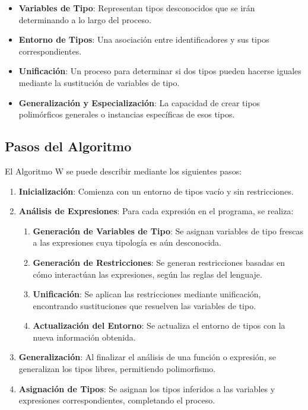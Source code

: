 \documentclass{article}
\begin{document}
  \begin{itemize}
    \item \textbf{Variables de Tipo}: Representan tipos desconocidos que se irán determinando a lo largo del proceso.

    \item \textbf{Entorno de Tipos}: Una asociación entre identificadores y sus tipos correspondientes.

    \item \textbf{Unificación}: Un proceso para determinar si dos tipos pueden hacerse iguales mediante la sustitución de variables de tipo.

    \item \textbf{Generalización y Especialización}: La capacidad de crear tipos polimórficos generales o instancias específicas de esos tipos.
  \end{itemize}

  \subsection{Pasos del Algoritmo}

  El Algoritmo W se puede describir mediante los siguientes pasos:

  \begin{enumerate}
    \item \textbf{Inicialización}: Comienza con un entorno de tipos vacío y sin restricciones.

    \item \textbf{Análisis de Expresiones}: Para cada expresión en el programa, se realiza:

    \begin{enumerate}
      \item \textbf{Generación de Variables de Tipo}: Se asignan variables de tipo frescas a las expresiones cuya tipología es aún desconocida.

      \item \textbf{Generación de Restricciones}: Se generan restricciones basadas en cómo interactúan las expresiones, según las reglas del lenguaje.

      \item \textbf{Unificación}: Se aplican las restricciones mediante unificación, encontrando sustituciones que resuelven las variables de tipo.

      \item \textbf{Actualización del Entorno}: Se actualiza el entorno de tipos con la nueva información obtenida.
    \end{enumerate}

    \item \textbf{Generalización}: Al finalizar el análisis de una función o expresión, se generalizan los tipos libres, permitiendo polimorfismo.

    \item \textbf{Asignación de Tipos}: Se asignan los tipos inferidos a las variables y expresiones correspondientes, completando el proceso.
  \end{enumerate}
\end{document}

